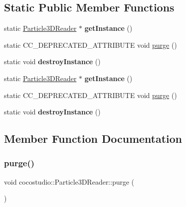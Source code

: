 \subsection*{Static Public Member Functions}
\begin{DoxyCompactItemize}
\item 
\mbox{\label{classcocostudio_1_1Particle3DReader_a2d08c6b75719b3343c2823ad80b00b3c}} 
static \hyperlink{classcocostudio_1_1Particle3DReader}{Particle3\+D\+Reader} $\ast$ {\bfseries get\+Instance} ()
\item 
static C\+C\+\_\+\+D\+E\+P\+R\+E\+C\+A\+T\+E\+D\+\_\+\+A\+T\+T\+R\+I\+B\+U\+TE void \hyperlink{classcocostudio_1_1Particle3DReader_a07a510c581a268cfbe3fe123cc971b68}{purge} ()
\item 
\mbox{\label{classcocostudio_1_1Particle3DReader_a4eed6858f4228b29eebfd274815bf577}} 
static void {\bfseries destroy\+Instance} ()
\item 
\mbox{\label{classcocostudio_1_1Particle3DReader_a6b2c7bf8318608dfb3be4c8814070541}} 
static \hyperlink{classcocostudio_1_1Particle3DReader}{Particle3\+D\+Reader} $\ast$ {\bfseries get\+Instance} ()
\item 
static C\+C\+\_\+\+D\+E\+P\+R\+E\+C\+A\+T\+E\+D\+\_\+\+A\+T\+T\+R\+I\+B\+U\+TE void \hyperlink{classcocostudio_1_1Particle3DReader_a054ae03e43d93eb07de4f1e1f6950e1c}{purge} ()
\item 
\mbox{\label{classcocostudio_1_1Particle3DReader_a638ac389219bae1cd12916c2b5d17258}} 
static void {\bfseries destroy\+Instance} ()
\end{DoxyCompactItemize}


\subsection{Member Function Documentation}
\mbox{\label{classcocostudio_1_1Particle3DReader_a07a510c581a268cfbe3fe123cc971b68}} 
\subsubsection{\texorpdfstring{purge()}{purge()}\hspace{0.1cm}{\footnotesize\ttfamily [1/2]}}
{\footnotesize\ttfamily void cocostudio\+::\+Particle3\+D\+Reader\+::purge (\begin{DoxyParamCaption}{ }\end{DoxyParamCaption})\hspace{0.3cm}{\ttfamily [static]}}

